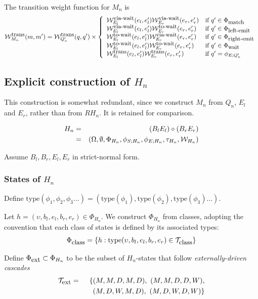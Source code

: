 \documentclass{article}
\newcommand{\seclabel}[1]{\label{sec.#1}}
\newcommand\compose{}
\newcommand\fork{\circ}
\newcommand\States{\Phi}
\newcommand\statesof[1]{\States_{#1}}
\newcommand\Transitions{\tau}
\newcommand\transitionsof[1]{\Transitions_{#1}}
\newcommand\startstateof[1]{\phi_{S;#1}}
\newcommand\laststateof[1]{\phi_{E;#1}}
\newcommand\weight{{\cal W}}
\newcommand\weightfunof[1]{\weight_{#1}}
\newcommand\transweightfun[1]{\weightfunof{#1}^{\mbox{\small trans}}}
\newcommand\transviawait[1]{\weightfunof{#1}^{\mbox{\small via-wait}}}
\newcommand\transtowait[1]{\weightfunof{#1}^{\mbox{\small to-wait}}}
\newcommand\statetype{\mbox{type}}
\newcommand\typeset[1]{{\cal T}_{\mbox{\small #1}}}
\newcommand\stateset[1]{\statesof{\mbox{\small #1}}}
\newcommand\hstate{(\upsilon,b_l,e_l,b_r,e_r)}
\newcommand\externalsuffix{ext}
\newcommand\waitsuffix{wait}
\newcommand\externalcascades{\stateset{\externalsuffix}}
\newcommand\waitstates{\stateset{\waitsuffix}}
\newcommand\externaltypes{\typeset{\externalsuffix}}
\newcommand\matchsuffix{match}
\newcommand\leftemitsuffix{left-emit}
\newcommand\rightemitsuffix{right-emit}
\newcommand\matchstates{\stateset{\matchsuffix}}
\newcommand\leftemitstates{\stateset{\leftemitsuffix}}
\newcommand\rightemitstates{\stateset{\rightemitsuffix}}
\begin{document}
The transition weight function for $M_n$ is
\[
\transweightfun{M_n}(m,m') = \transweightfun{Q'_n}(q,q') \times \left\{
\begin{array}{ll}
\transviawait{E_l}(e_l,e'_l) \transviawait{E_r}(e_r,e'_r)
 & \mbox{if $q' \in \matchstates $} \\
\transviawait{E_l}(e_l,e'_l) \transtowait{E_r}(e_r,e'_r)
 & \mbox{if $q' \in \leftemitstates$} \\
\transtowait{E_l}(e_l,e'_l) \transviawait{E_r}(e_r,e'_r)
 & \mbox{if $q' \in \rightemitstates$} \\
\transtowait{E_l}(e_l,e'_l) \transtowait{E_r}(e_r,e'_r)
 & \mbox{if $q' \in \waitstates$} \\
\transweightfun{E_l}(e_l,e'_l) \transweightfun{E_r}(e_r,e'_r)
 & \mbox{if $q' = \laststateof{Q'_n}$}
\end{array}
\right.
\]


\subsection{Explicit construction of $H_n$}
\seclabel{Hn}
This construction is somewhat redundant, since we construct $M_n$ from $Q_n$, $E_l$ and $E_r$, rather than from $R \compose H_n$.
It is retained for comparison.

\begin{eqnarray*}
H_n & = & (B_l \compose E_l) \fork (B_r \compose E_r) \\
& = & (\Omega,\emptyset,\statesof{H_n},\startstateof{H_n},\laststateof{H_n},\transitionsof{H_n},\weightfunof{H_n}) \\
\end{eqnarray*}

Assume $B_l,B_r,E_l,E_r$ in strict-normal form.

\subsubsection{States of $H_n$}

Define $\statetype(\phi_1,\phi_2,\phi_3 \ldots) = (\statetype(\phi_1), \statetype(\phi_2), \statetype(\phi_3) \ldots)$.

Let $h=\hstate\in\statesof{H_n}$.
We construct $\statesof{H_n}$ from classes, adopting the convention that each class of states is defined by its associated types:
\[
\stateset{class} = \{ h: \statetype\hstate \in \typeset{class} \}
\]

Define $\externalcascades \subset \statesof{H_n}$ to be the subset of $H_n$-states that follow {\em externally-driven cascades}
\begin{eqnarray*}
\externaltypes & = & \{ (M,M,D,M,D),\ (M,M,D,D,W), \\
& & \quad (M,D,W,M,D),\ (M,D,W,D,W) \}
\end{eqnarray*}
\end{document}
